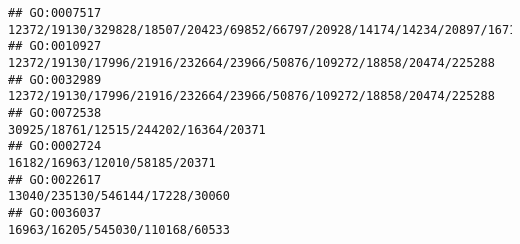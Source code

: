 \documentclass[
]{article}
\begin{document}
\begin{verbatim}
## GO:0007517                                                                                                                                                                                                                                                                               12372/19130/329828/18507/20423/69852/66797/20928/14174/14234/20897/16716/22634/15110/18858/14422/20666/20474/65256/17263/21380
## GO:0010927                                                                                                                                                                                                                                                                                                                                         12372/19130/17996/21916/232664/23966/50876/109272/18858/20474/225288
## GO:0032989                                                                                                                                                                                                                                                                                                                                         12372/19130/17996/21916/232664/23966/50876/109272/18858/20474/225288
## GO:0072538                                                                                                                                                                                                                                                                                                                                                                         30925/18761/12515/244202/16364/20371
## GO:0002724                                                                                                                                                                                                                                                                                                                                                                                16182/16963/12010/58185/20371
## GO:0022617                                                                                                                                                                                                                                                                                                                                                                              13040/235130/546144/17228/30060
## GO:0036037                                                                                                                                                                                                                                                                                                                                                                              16963/16205/545030/110168/60533

\end{verbatim}
\end{document}
